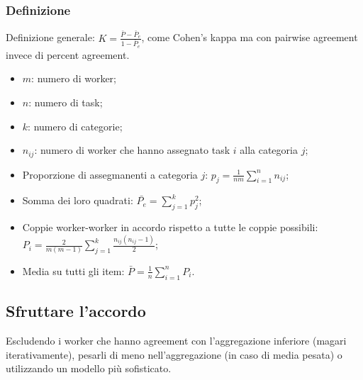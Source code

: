 \documentclass{article}
\begin{document}
    \subsubsection{Definizione}
      Definizione generale: $K = \frac{\bar{P}-\bar{P}_e}{1-\bar{P}_e}$, come Cohen's kappa ma con pairwise agreement invece di percent agreement.
      \begin{itemize}
          \item $m$: numero di worker;
          \item $n$: numero di task;
          \item $k$: numero di categorie;
          \item $n_{ij}$: numero di worker che hanno assegnato task $i$ alla categoria $j$;
          \item Proporzione di assegmanenti a categoria $j$: $p_j = \frac{1}{nm}\sum_{i=1}^nn_{ij}$;
          \item Somma dei loro quadrati: $\bar{P_e} = \sum_{j=1}^kp_j^2$;
          \item Coppie worker-worker in accordo rispetto a tutte le coppie possibili: $P_i = \frac{2}{m(m-1)}\sum_{j=1}^k\frac{n_{ij}(n_{ij}-1)}{2}$;
          \item Media su tutti gli item: $\bar{P}=\frac{1}{n}\sum_{i=1}^nP_i$.
      \end{itemize}
  \subsection{Sfruttare l'accordo}
    Escludendo i worker che hanno agreement con l'aggregazione inferiore (magari iterativamente), pesarli di meno nell'aggregazione (in caso di media pesata) o utilizzando un modello più sofisticato.
\end{document}
